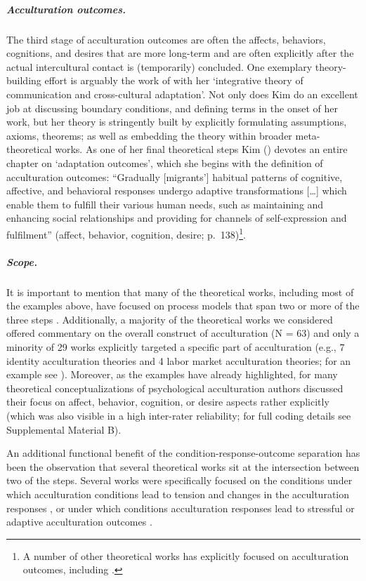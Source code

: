 \subparagraph{Acculturation outcomes.}

The third stage of acculturation outcomes are often the affects,
behaviors, cognitions, and desires that are more long-term and are often
explicitly after the actual intercultural contact is (temporarily)
concluded. One exemplary theory-building effort is arguably the work of
\citet[][]{Kim1988} with her `integrative theory of communication and
cross-cultural adaptation'. Not only does Kim do an excellent job at
discussing boundary conditions, and defining terms in the onset of her
work, but her theory is stringently built by explicitly formulating
assumptions, axioms, theorems; as well as embedding the theory within
broader meta-theoretical works. As one of her final theoretical steps
Kim (\citeyear[][]{Kim1988}) devotes an entire chapter on `adaptation
outcomes', which she begins with the definition of acculturation
outcomes: ``Gradually {[}migrants'{]} habitual patterns of cognitive,
affective, and behavioral responses undergo adaptive transformations
{[}\ldots{]} which enable them to fulfill their various human needs,
such as maintaining and enhancing social relationships and providing for
channels of self-expression and fulfilment'' (affect, behavior,
cognition, desire;
p.~138)\footnote{A number of other theoretical works has explicitly focused on acculturation outcomes, including \citet[][]{Baird2015, Berry1998, Berry1992, Berry2005, Riedel2011, Rogler1994, Luedicke2011}.}.

\subparagraph{Scope.}

It is important to mention that many of the theoretical works, including
most of the examples above, have focused on process models that span two
or more of the three steps
\citep[e.g.,][]{Berry1992, Ward2016, Arends-Toth2006a, Rogler1994}.
Additionally, a majority of the theoretical works we considered offered
commentary on the overall construct of acculturation (N = 63) and only a
minority of 29 works explicitly targeted a specific part of
acculturation (e.g., 7 identity acculturation theories and 4 labor
market acculturation theories; for an example see
\citealp{Weinreich2009}). Moreover, as the examples have already
highlighted, for many theoretical conceptualizations of psychological
acculturation authors discussed their focus on affect, behavior,
cognition, or desire aspects rather explicitly (which was also visible
in a high inter-rater reliability; for full coding details see
Supplemental Material B).

An additional functional benefit of the condition-response-outcome
separation has been the observation that several theoretical works sit
at the intersection between two of the steps. Several works were
specifically focused on the conditions under which acculturation
conditions lead to tension and changes in the acculturation responses
\citep[i.e., conditions of change; e.g.,][]{Masgoret2006, Alitolppa-Niitamo2004, Grove1985, Wood2014},
or under which conditions acculturation responses lead to stressful or
adaptive acculturation outcomes
\citep[i.e., conditions of stress; e.g.,][; also see  and Figure S1]{Ryan2008, Berry1992, Benet-Martinez2005, Salo2015, Wood2014, Hajro2019}.

